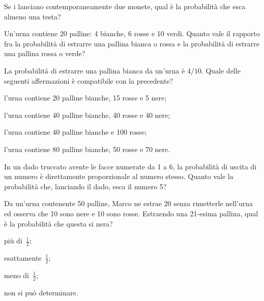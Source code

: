 \begin{esercizio}[2006~\Ast]
\label{ese:9.74}
Se i lanciano contemporaneamente due monete, qual è la probabilità che esca almeno una testa?
\end{esercizio}

\begin{esercizio}[2006~\Ast]
\label{ese:9.75}
Un'urna contiene 20 palline: 4 bianche, 6 rosse e 10 verdi. Quanto vale il rapporto fra la probabilità di estrarre una pallina bianca o rossa e la probabilità di estrarre una pallina rossa o verde?
\end{esercizio}

\begin{esercizio} [2006~\Ast]
\label{ese:9.76}
La probabilità di estrarre una pallina bianca da un'urna è $4/10$. Quale delle seguenti affermazioni è compatibile con la precedente?
\begin{enumeratea}
\item l'urna contiene 20 palline bianche, 15 rosse e 5 nere;
\item l'urna contiene 40 palline bianche, 40 rosse e 40 nere;
\item l'urna contiene 40 palline bianche e 100 rosse;
\item l'urna contiene 80 palline bianche, 50 rosse e 70 nere.
\end{enumeratea}
\end{esercizio}

\begin{esercizio}[2006~\Ast]
\label{ese:9.77}
In un dado truccato avente le facce numerate da 1 a 6, la probabilità di uscita di un numero è direttamente proporzionale al numero stesso. Quanto vale la probabilità che, lanciando il dado, esca il numero 5?
\end{esercizio}

\begin{esercizio}[2007~\Ast]
\label{ese:9.78}
Da un'urna contenente 50 palline, Marco ne estrae 20 senza rimetterle nell'urna ed osserva che 10 sono nere e 10 sono rosse. Estraendo una 21-esima pallina, qual è la probabilità che questa si nera?
\begin{multicols}{2}
\begin{enumeratea}
\item più di~$\frac{1}{2}$;
\item esattamente~$\frac{1}{2}$;
\item meno di~$\frac{1}{2}$;
\item non si può determinare.
\end{enumeratea}
\end{multicols}
\end{esercizio}


